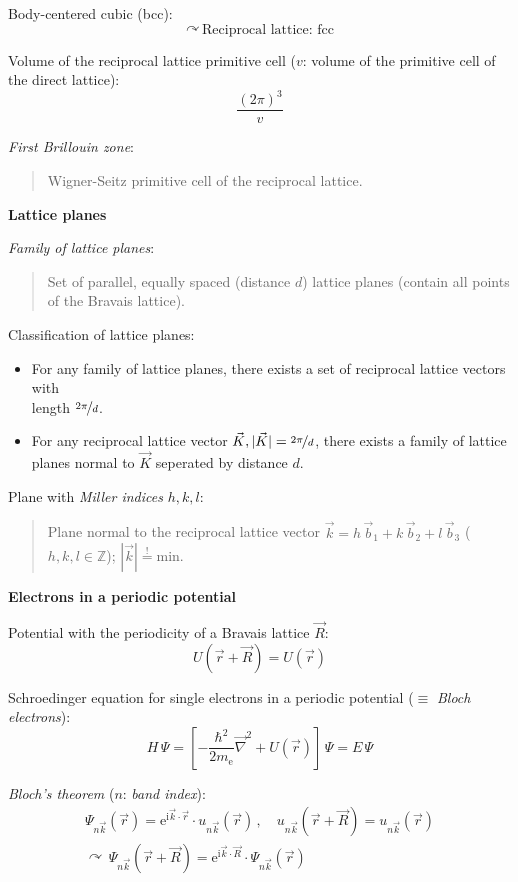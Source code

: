 \documentclass[fontsize=11pt,a4paper]{scrartcl}
\begin{document}
Body-centered cubic (bcc):
\[
	\curvearrowright\,\text{Reciprocal lattice: fcc}
\]

Volume of the reciprocal lattice primitive cell ($v$: volume of the primitive cell of the direct lattice):
\[
	\frac{(2\pi)^3}{v}
\]

\emph{First Brillouin zone}:
\begin{quote}
	Wigner-Seitz primitive cell of the reciprocal lattice.
\end{quote}

\textbf{\normalsize{Lattice planes}}

\emph{Family of lattice planes}:
\begin{quote}
	Set of parallel, equally spaced (distance $d$) lattice planes (contain all points of the Bravais lattice).
\end{quote}

Classification of lattice planes:
\begin{itemize}
	\item For any family of lattice planes, there exists a set of reciprocal lattice vectors with\\ length $\nicefrac{2\pi}{d}$.
	\item For any reciprocal lattice vector $\vec K, |\vec K|=\nicefrac{2\pi}{d}$, there exists a family of lattice planes normal to $\vec K$ seperated by distance $d$.
\end{itemize}

Plane with \emph{Miller indices} $h,k,l$:
\begin{quote}
	Plane normal to the reciprocal lattice vector $\vec k=h\,\vec b_1+k\,\vec b_2+l\,\vec b_3$ ($h,k,l\in\mathbb{Z}$); $|\vec k|\stackrel{!}{=}\text{min}$.
\end{quote}


\textbf{\Large{Electrons in a periodic potential}}

Potential with the periodicity of a Bravais lattice $\vec R$:
\[
	U(\vec r+\vec R)=U(\vec r)
\]

Schroedinger equation for single electrons in a periodic potential ($\equiv$ \emph{Bloch electrons}):
\[
	H\,\Psi=\left[-\frac{\hbar^2}{2m_\mathrm{e}}\vec\nabla^2+U(\vec r)\right]\,\Psi=E\,\Psi
\]

\emph{Bloch's theorem} ($n$: \emph{band index}):
\begin{gather*}
	\Psi_{n\vec k}(\vec r)=\mathrm{e}^{\mathrm{i}\vec k\cdot\vec r}\cdot u_{n\vec k}(\vec r)\,,\quad
	u_{n\vec k}(\vec r+\vec R)=u_{n\vec k}(\vec r)\\
	\curvearrowright\,\Psi_{n\vec k}(\vec r+\vec R)=\mathrm{e}^{\mathrm{i}\vec k\cdot\vec R}\cdot\Psi_{n\vec k}(\vec r)
\end{gather*}
\end{document}
